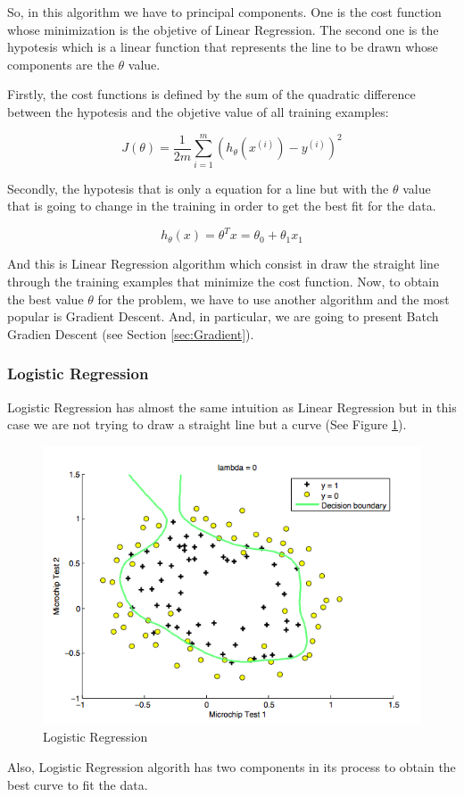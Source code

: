 \documentclass[12pt]{article}
\begin{document}
So, in this algorithm we have to principal components. One is the cost function whose minimization is the objetive of Linear Regression. The second one is the hypotesis which is a linear function that represents the line to be drawn whose components are the $\theta$ value. 

Firstly, the cost functions is defined by the sum of the quadratic difference between the hypotesis and the objetive value of all training examples:

\begin{equation}
  J(\theta)=\frac{1}{2m} \displaystyle\sum_{i=1}^{m} (h_{\theta}(x^{(i)})-y^{(i)})^2
\end{equation}

Secondly, the hypotesis that is only a equation for a line but with the $\theta$ value that is going to change in the training in order to get the best fit for the data.

\begin{equation}
  h_{\theta}(x)=\theta^Tx=\theta_{0}+\theta_{1}x_{1}
\end{equation}

And this is Linear Regression algorithm which consist in draw the straight line through the training examples that minimize the cost function. Now, to obtain the best value $\theta$ for the problem, we have to use another algorithm and the most popular is Gradient Descent. And, in particular, we are going to present Batch Gradien Descent (see Section \ref{sec:Gradient}).

\subsubsection{Logistic Regression}
Logistic Regression has almost the same intuition as Linear Regression but in this case we are not trying to draw a straight line but a curve (See Figure \ref{fig:figure4}).
\begin{figure}[ht]
\centering
\includegraphics[width=.6\textwidth]{Logistic.png}
\caption{Logistic Regression}
\label{fig:figure4}
\end{figure}
Also, Logistic Regression algorith has two components in its process to obtain the best curve to fit the data.
\end{document}
